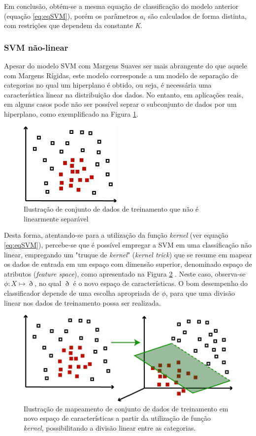 Em conclusão, obtém-se a mesma equação de classificação do modelo anterior (equação \ref{eq:eqSVM}), porém os parâmetros $a_i$ são calculados de forma distinta, com restrições que dependem da constante \textit{K}.

\subsubsection{SVM não-linear}

Apesar do modelo SVM com Margens Suaves ser mais abrangente do que aquele com Margens Rígidas, este modelo corresponde a um modelo de separação de categorias no qual um hiperplano é obtido, ou seja, é necessária uma característica linear na distribuição dos dados. No entanto, em aplicações reais, em alguns casos pode não ser possível seprar o subconjunto de dados por um hiperplano, como exemplificado na Figura \ref{fig:svmNL}.

\begin{figure}[H]
 \centering
  \includegraphics[width=0.35\linewidth]{figuras/svmNL.pdf}
  \caption{Ilustração de conjunto de dados de treinamento que não é linearmente separável}
  \label{fig:svmNL}
\end{figure}

Desta forma, atentando-se para a utilização da função \textit{kernel} (ver equação \ref{eq:eqSVM}), percebe-se que é possível empregar a SVM em uma classificação não linear, empregando um "truque de \textit{kernel}" { }(\textit{kernel trick}) que se resume em mapear os dados de entrada em um espaço com dimensão superior, denominado espaço de atributos (\textit{feature space}), como apresentado na Figura \ref{fig:svmKernel}  . Neste caso, observa-se $\phi:X\mapsto\eth$, no qual $\eth$ é o novo espaço de características. O bom desempenho do classificador depende de uma escolha apropriada de $\phi$, para que uma divisão linear nos dados de treinamento possa ser realizada.

\begin{figure}[H]
 \centering
  \includegraphics[width=0.75\linewidth]{figuras/svmKernel.pdf}
  \caption{Ilustração de mapeamento de conjunto de dados de treinamento em novo espaço de características a partir da utilização de função \textit{kernel}, possibilitando a divisão linear entre as categorias.}
  \label{fig:svmKernel}
\end{figure}


